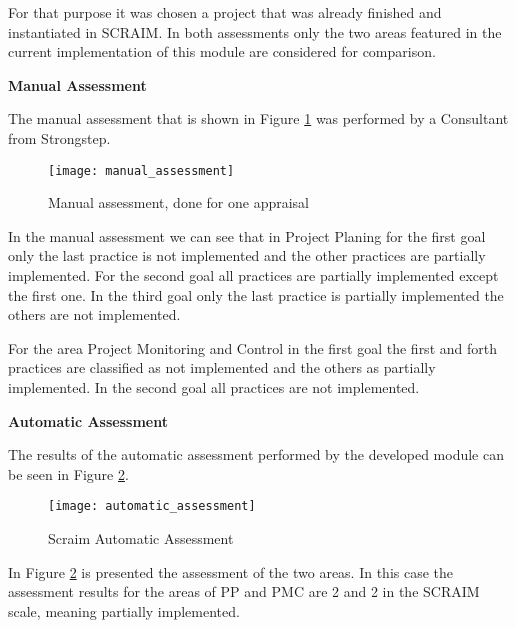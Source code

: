 For that purpose it was chosen a project that was already finished and instantiated in SCRAIM.
In both assessments only the two areas featured in the current implementation of this module are considered for comparison.

\vspace{1cm}

\textbf{Manual Assessment}

The manual assessment that is shown in Figure \ref{fig:manual_assessment} was performed by a Consultant from Strongstep.

\begin{figure}[h]
	\begin{center}
		\leavevmode
		\texttt{[image: manual\_assessment]}
		\caption{Manual assessment, done for one appraisal}
		\label{fig:manual_assessment}
	\end{center}
\end{figure}


In the manual assessment we can see that in Project Planing for the first goal only the last practice is not implemented and the other practices are partially implemented. For the second goal all practices are partially implemented except the first one.
In the third goal only the last practice is partially implemented the others are not implemented.

For the area Project Monitoring and Control in the first goal the first and forth practices are classified as not implemented and the others as partially implemented. In the second goal all practices are not implemented.

\vspace{1cm}

\textbf{Automatic Assessment}

The results of the automatic assessment performed by the developed module can be seen in Figure \ref{fig:automatic_assessment}.

\begin{figure}[h]
	\begin{center}
		\leavevmode
		\texttt{[image: automatic\_assessment]}
		\caption{Scraim Automatic Assessment}
		\label{fig:automatic_assessment}
	\end{center}
\end{figure}

In Figure \ref{fig:automatic_assessment} is presented the assessment of the two areas. In this case the assessment results for the areas of PP and PMC are 2 and 2 in the SCRAIM scale, meaning partially implemented.

